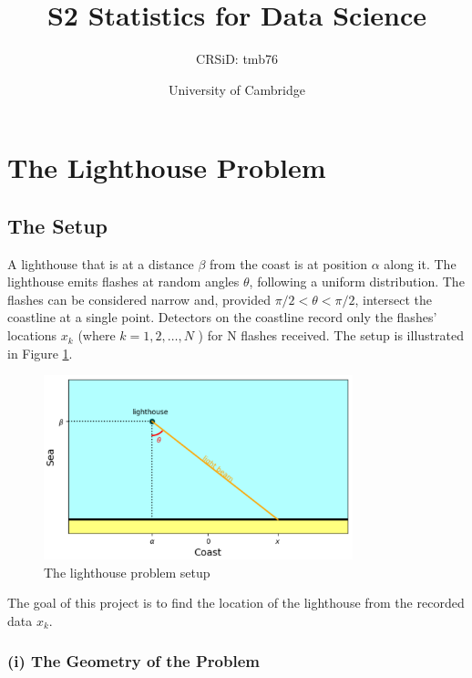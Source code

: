 \documentclass[12pt]{report} %
\title{S2 Statistics for Data Science}
\author{CRSiD: tmb76}
\date{University of Cambridge}
\begin{document}
 

\maketitle

\tableofcontents

\chapter*{The Lighthouse Problem}

\section*{The Setup}

\indent A lighthouse that is at a distance $\beta$ from the coast is at position $\alpha$ along it. The lighthouse emits flashes at random angles $\theta$, following a uniform distribution. The flashes can be considered narrow and, provided $\pi/2 < \theta < \pi/2$, intersect the coastline at a single point. Detectors on the coastline record only the flashes' locations $x_{k}$ (where $k = 1, 2,\dots, N$ ) for N flashes received. The setup is illustrated in Figure \ref{fig:lighthouse}.

\begin{figure}[h]
\centering
\includegraphics[width=0.8\textwidth]{../Plots/lighthouse diagram.png}
\caption{The lighthouse problem setup}
\label{fig:lighthouse}
\end{figure}


The goal of this project is to find the location of the lighthouse from the recorded data ${x_{k}}$.

\subsection*{(i) The Geometry of the Problem}
\end{document}
